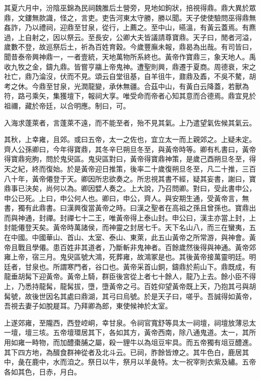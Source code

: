 其夏六月中，汾陰巫錦為民祠魏脽后土營旁，見地如鉤狀，掊視得鼎。鼎大異於眾鼎，文鏤無款識，怪之，言吏。吏告河東太守勝，勝以聞。天子使使驗問巫得鼎無姦詐，乃以禮祠，迎鼎至甘泉，從行，上薦之。至中山，曣溫，有黃云蓋焉。有麃過，上自射之，因以祭云。至長安，公卿大夫皆議請尊寶鼎。天子曰，閒者河溢，歲數不登，故巡祭后土，祈為百姓育穀。今歲豐廡未報，鼎曷為出哉。有司皆曰，聞昔泰帝興神鼎一，一者壹統，天地萬物所系終也。黃帝作寶鼎三，象天地人。禹收九牧之金，鑄九鼎。皆嘗亨鬺上帝鬼神。遭聖則興，鼎遷于夏商。周德衰，宋之社亡，鼎乃淪沒，伏而不見。頌云自堂徂基，自羊徂牛，鼐鼎及鼒，不吳不驁，胡考之休。今鼎至甘泉，光潤龍變，承休無疆。合茲中山，有黃白云降蓋，若獸為符，路弓乘矢，集獲壇下，報祠大享。唯受命而帝者心知其意而合德焉。鼎宜見於祖禰，藏於帝廷，以合明應。制曰，可。

入海求蓬萊者，言蓬萊不遠，而不能至者，殆不見其氣。上乃遣望氣佐候其氣云。

其秋，上幸雍，且郊。或曰五帝，太一之佐也，宜立太一而上親郊之。上疑未定。齊人公孫卿曰，今年得寶鼎，其冬辛巳朔旦冬至，與黃帝時等。卿有札書曰，黃帝得寶鼎宛朐，問於鬼臾區。鬼臾區對曰，黃帝得寶鼎神策，是歲己酉朔旦冬至，得天之紀，終而復始。於是黃帝迎日推策，後率二十歲復朔旦冬至，凡二十推，三百八十年，黃帝僊登于天。卿因所忠欲奏之。所忠視其書不經，疑其妄書，謝曰，寶鼎事已決矣，尚何以為。卿因嬖人奏之。上大說，乃召問卿。對曰，受此書申公，申公已死。上曰，申公何人也。卿曰，申公，齊人。與安期生通，受黃帝言，無書，獨有此鼎書。曰漢興復當黃帝之時。曰漢之聖者在高祖之孫且曾孫也。寶鼎出而與神通，封禪。封禪七十二王，唯黃帝得上泰山封。申公曰，漢主亦當上封，上封能僊登天矣。黃帝時萬諸侯，而神靈之封居七千。天下名山八，而三在蠻夷，五在中國。中國華山、首山、太室、泰山、東萊，此五山黃帝之所常游，與神會。黃帝且戰且學僊。患百姓非其道者，乃斷斬非鬼神者。百餘歲然後得與神通。黃帝郊雍上帝，宿三月。鬼臾區號大鴻，死葬雍，故鴻冢是也。其後黃帝接萬靈明廷。明廷者，甘泉也。所謂寒門者，谷口也。黃帝采首山銅，鑄鼎於荊山下。鼎既成，有龍垂胡髯下迎黃帝。黃帝上騎，群臣後宮從上者七十餘人，龍乃上去。餘小臣不得上，乃悉持龍髯，龍髯拔，墮，墮黃帝之弓。百姓仰望黃帝既上天，乃抱其弓與胡髯號，故後世因名其處曰鼎湖，其弓曰烏號。於是天子曰，嗟乎。吾誠得如黃帝，吾視去妻子如脫屣耳。乃拜卿為郎，東使候神於太室。

上遂郊雍，至隴西，西登崆峒，幸甘泉。令祠官寬舒等具太一祠壇，祠壇放薄忌太一壇，壇三垓。五帝壇環居其下，各如其方，黃帝西南，除八通鬼道。太一，其所用如雍一畤物，而加醴棗脯之屬，殺一貍牛以為俎豆牢具。而五帝獨有俎豆醴進。其下四方地，為醊食群神從者及北斗云。已祠，胙餘皆燎之。其牛色白，鹿居其中，彘在鹿中，水而洎之。祭日以牛，祭月以羊彘特。太一祝宰則衣紫及繡。五帝各如其色，日赤，月白。

